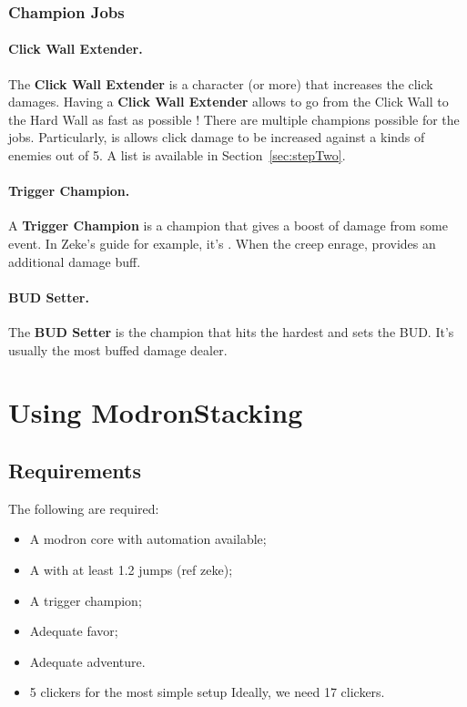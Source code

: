 \documentclass{article}
\begin{document}
\subsubsection{Champion Jobs}

\paragraph{Click Wall Extender.}
\label{sec:clickWallExtender}

The \textbf{Click Wall Extender} is a character (or more) that increases the click damages.
Having a \textbf{Click Wall Extender} allows to go from the Click Wall to the Hard Wall as fast as possible !
There are multiple champions possible for the jobs.
Particularly, \minsc is allows click damage to be increased against a kinds of enemies out of 5.
A list is available in Section~\ref{sec:stepTwo}.

\paragraph{Trigger Champion.}

A \textbf{Trigger Champion} is a champion that gives a boost of damage from some event.
In Zeke's guide for example, it's \dragonbait.
When the creep enrage, \dragonbait provides an additional damage buff.

\paragraph{BUD Setter.}

The \textbf{BUD Setter} is the champion that hits the hardest and sets the BUD.
It's usually the most buffed damage dealer.


\section{Using Modron\briv Stacking}

\subsection{Requirements}

The following are required:
\begin{itemize}
    \item A modron core with automation available;
    \item A \briv with at least 1.2 jumps (ref zeke);
    \item A trigger champion;
    \item Adequate favor;
    \item Adequate adventure.
    \item 5 clickers for the most simple setup Ideally, we need 17 clickers.
\end{itemize}
\end{document}

